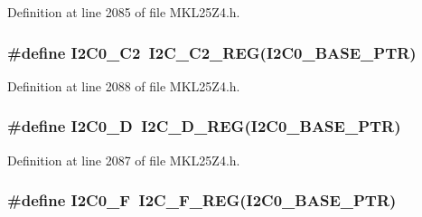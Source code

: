 Definition at line 2085 of file M\+K\+L25\+Z4.\+h.

\subsubsection[{\texorpdfstring{I2\+C0\+\_\+\+C2}{I2C0_C2}}]{\setlength{\rightskip}{0pt plus 5cm}\#define I2\+C0\+\_\+\+C2~{\bf I2\+C\+\_\+\+C2\+\_\+\+R\+EG}({\bf I2\+C0\+\_\+\+B\+A\+S\+E\+\_\+\+P\+TR})}\hypertarget{group___i2_c___register___accessor___macros_gaeff876311aea33455ceb8ef9fb50b4c7}{}\label{group___i2_c___register___accessor___macros_gaeff876311aea33455ceb8ef9fb50b4c7}


Definition at line 2088 of file M\+K\+L25\+Z4.\+h.

\subsubsection[{\texorpdfstring{I2\+C0\+\_\+D}{I2C0_D}}]{\setlength{\rightskip}{0pt plus 5cm}\#define I2\+C0\+\_\+D~{\bf I2\+C\+\_\+\+D\+\_\+\+R\+EG}({\bf I2\+C0\+\_\+\+B\+A\+S\+E\+\_\+\+P\+TR})}\hypertarget{group___i2_c___register___accessor___macros_ga1f0514321da14a62a0352b297e6614b7}{}\label{group___i2_c___register___accessor___macros_ga1f0514321da14a62a0352b297e6614b7}


Definition at line 2087 of file M\+K\+L25\+Z4.\+h.

\subsubsection[{\texorpdfstring{I2\+C0\+\_\+F}{I2C0_F}}]{\setlength{\rightskip}{0pt plus 5cm}\#define I2\+C0\+\_\+F~{\bf I2\+C\+\_\+\+F\+\_\+\+R\+EG}({\bf I2\+C0\+\_\+\+B\+A\+S\+E\+\_\+\+P\+TR})}\hypertarget{group___i2_c___register___accessor___macros_gacd455dbff54b6e42523e833319e562e4}{}\label{group___i2_c___register___accessor___macros_gacd455dbff54b6e42523e833319e562e4}


